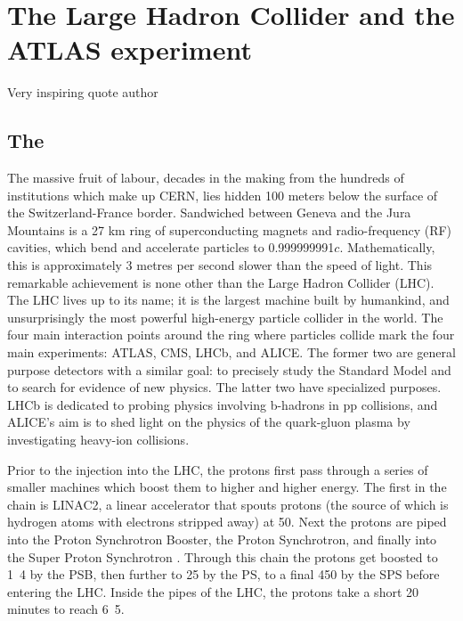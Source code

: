 \chapter{The Large Hadron Collider and the ATLAS experiment}
\label{chap:ATLASdetector}

{Very inspiring quote author}

\section{The \LHC}
\label{sec:LHC}

The massive fruit of labour, decades in the making from the hundreds of institutions which make up CERN, lies hidden 100 meters below the surface of the Switzerland-France border. Sandwiched between Geneva and the Jura Mountains is a 27 km ring of superconducting magnets and radio-frequency (RF) cavities, which bend and accelerate particles to 0.999999991$c$. Mathematically, this is approximately 3 metres per second slower than the speed of light. This remarkable achievement is none other than the Large Hadron Collider (LHC). The LHC lives up to its name; it is the largest machine built by humankind, and unsurprisingly the most powerful high-energy particle collider in the world. The four main interaction points around the ring where particles collide mark the four main experiments: ATLAS, CMS, LHCb, and ALICE. The former two are general purpose detectors with a similar goal: to precisely study the Standard Model and to search for evidence of new physics. The latter two have specialized purposes. LHCb is dedicated to probing physics involving b-hadrons in pp collisions, and ALICE’s aim is to shed light on the physics of the quark-gluon plasma by investigating heavy-ion collisions. 

Prior to the injection into the LHC, the protons first pass through a series of smaller machines which boost them to higher and higher energy. The first in the chain is LINAC2, a linear accelerator that spouts protons (the source of which is hydrogen atoms with electrons stripped away) at \unit{50}{\MeV}. Next the protons are piped into the Proton Synchrotron Booster, the Proton Synchrotron, and finally into the Super Proton Synchrotron . Through this chain the protons get boosted to \unit{1.4}{\GeV} by the PSB, then further to \unit{25}{\GeV} by the PS, to a final \unit{450}{\GeV} by the SPS before entering the LHC. Inside the pipes of the LHC, the protons take a short 20 minutes to reach \unit{6.5}{\TeV}. 

